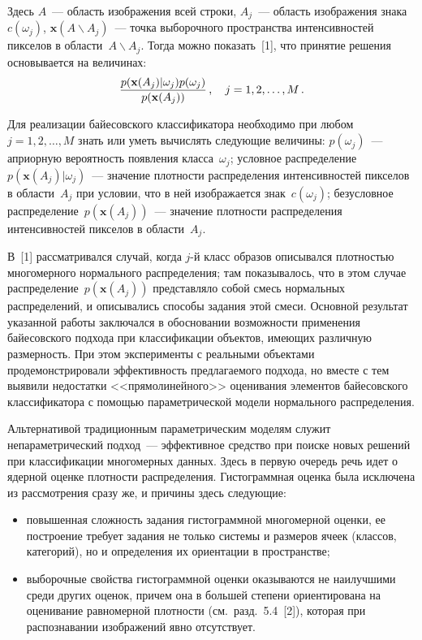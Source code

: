 \begin{multicols}{2}
      Здесь $A$~--- область изображения всей строки, $A_j$~--- область изображения 
знака~$c(\omega_j)$, $\mathbf{x}(A\backslash A_j)$~--- точка выборочного пространства 
интенсивностей пикселов в области~$A\backslash A_j$. Тогда можно показать~[1], что принятие 
решения основывается на величинах:
      \begin{equation}
      \displaystyle\frac{\displaystyle  p(\mathbf{x}(A_j)\vert \omega_j) p(\omega_j)\mathstrut}{\displaystyle p(\mathbf{x}(A_j))\mathstrut}\,,\quad j=1, 2, \ldots , 
M\,.
      \label{e1kk}
      \end{equation}
      
      Для реализации байесовского классификатора необходимо при любом  $j=1, 2, \ldots , M$ 
знать или уметь вычислять следующие величины: $p(\omega_j)$~--- априорную вероятность 
появления класса~$\omega_j$; условное распределение~$p(\mathbf{x}(A_j)\vert\omega_j)$~--- 
значение плотности распределения интенсивностей пикселов в области~$A_j$ при условии, что в 
ней изоб\-ра\-жа\-ет\-ся знак~$c(\omega_j)$; безусловное распределение~$p(\mathbf{x}(A_j))$~--- 
значение плотности распределения интенсивностей пикселов в области~$A_j$. 
      
      В~[1] рассматривался случай, когда $j$-й класс образов описывался плотностью 
многомерного нормального распределения; там показывалось, что в этом случае 
распределение~$p(\mathbf{x}(A_j))$ представляло собой смесь нормальных распределений, и 
описывались способы задания этой смеси. Основной результат указанной работы заключался в 
обосно\-ва\-нии возможности применения байесовского подхода при классификации объектов, 
имеющих различную размерность. При этом эксперименты с реальными объектами 
продемонстрировали эффективность предлагаемого подхода, но вместе с тем выявили недостатки 
<<прямолинейного>> оценивания элементов байесовского классификатора с помощью 
параметрической модели нормального распределения.
      
      Альтернативой традиционным параметрическим моделям служит непараметрический 
подход~--- эффективное средство при поиске новых решений при классификации многомерных 
данных. Здесь в первую очередь речь идет о ядерной оценке плотности распределения. 
Гистограммная оценка была исключена из рассмотрения сразу же, и причины здесь следующие:
      \begin{itemize}
\item повышенная сложность задания гисто\-грам\-мной многомерной оценки, ее 
построение требует задания не только системы и размеров ячеек (классов, категорий), но и 
определения их ориентации в пространстве;
\item выборочные свойства гистограммной оценки оказываются не наилучшими среди 
других оценок, причем она в большей степени ориентирована на оценивание равномерной 
плотности (см.\ разд.~5.4~[2]), которая при распознавании изображений явно отсутствует. 
\end{itemize}


\end{multicols}
